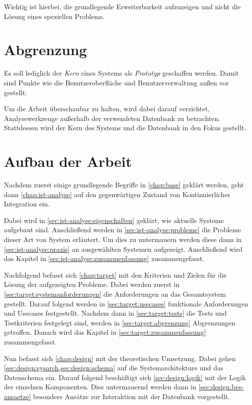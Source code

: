 Wichtig ist hierbei, die grundlegende Erweiterbarkeit aufzuzeigen
und nicht die Lösung eines speziellen Problems.

\section{Abgrenzung}
\label{sec:intro:abgrenzung}

Es soll lediglich der \emph{Kern} eines Systems als \emph{Prototyp} geschaffen werden.
Damit sind Punkte wie die Benutzeroberfläche und Benutzerverwaltung
außen vor gestellt.

Um die Arbeit überschaubar zu halten, wird dabei darauf verzichtet, Analysewerkzeuge außerhalb der verwendeten Datenbank zu betrachten.
Stattdessen wird der Kern des Systems und die Datenbank in den Fokus gestellt.


\section{Aufbau der Arbeit}
\label{sec:intro:aufbau}

Nachdem zuerst einige grundlegende Begriffe in \cref{chap:base} geklärt werden, geht dann \cref{chap:ist-analyse} auf den gegenwärtigen Zustand von Kontinuierlicher Integration ein.

Dabei wird in \cref{sec:ist-analyse:eigenschaften} geklärt, wie aktuelle Systeme aufgebaut sind. Anschließend werden in \cref{sec:ist-analyse:probleme} die Probleme dieser Art von System erläutert. Um dies zu untermauern werden diese dann in \cref{sec:ist-analyse:praxis} an ausgewählten Systemen aufgezeigt.
Anschließend wird das Kapitel in \cref{sec:ist-analyse:zusammenfassung} zusammengefasst.

Nachfolgend befasst sich \cref{chap:target} mit den Kriterien und Zielen für die Lösung der aufgezeigten Probleme. Dabei werden zuerst in \cref{sec:target:systemanforderungen} die Anforderungen an das Gesamtsystem gestellt. Darauf folgend werden in \cref{sec:target:usecases} funktionale Anforderungen und Usecases festgestellt. Nachdem dann in \cref{sec:target:tests} die Tests und Testkriterien festgelegt sind, werden in \cref{sec:target:abgrenzung} Abgrenzungen getroffen. Danach wird das Kapitel in \cref{sec:target:zusammenfassung} zusammengefasst.

Nun befasst sich \cref{chap:design} mit der theoretischen Umsetzung.
Dabei gehen \cref{sec:design:sysarch,sec:design:schema} auf die Systemarchitekture und das Datenschema ein. Darauf folgend beschäftigt sich \cref{sec:design:logik} mit der Logik der einzelnen Komponenten. Dies untermauernd werden dann in \cref{sec:design:bes-ansaetze} besondere Ansätze zur Interaktion mit der Datenbank vorgestellt.

